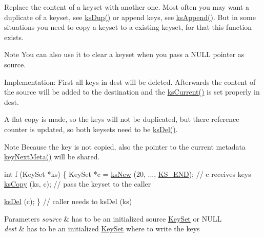 Replace the content of a keyset with another one. Most often you may want a duplicate of a keyset, see \hyperlink{group__keyset_gac59e4b328245463f1451f68d5106151c}{ks\+Dup()} or append keys, see \hyperlink{group__keyset_ga21eb9c3a14a604ee3a8bdc779232e7b7}{ks\+Append()}. But in some situations you need to copy a keyset to a existing keyset, for that this function exists.

\begin{DoxyNote}{Note}
You can also use it to clear a keyset when you pass a N\+U\+LL pointer as {\ttfamily source}.
\end{DoxyNote}
\begin{DoxyParagraph}{Implementation\+:}
First all keys in {\ttfamily dest} will be deleted. Afterwards the content of the source will be added to the destination and the \hyperlink{group__keyset_ga4287b9416912c5f2ab9c195cb74fb094}{ks\+Current()} is set properly in {\ttfamily dest}.
\end{DoxyParagraph}
A flat copy is made, so the keys will not be duplicated, but there reference counter is updated, so both keysets need to be \hyperlink{group__keyset_ga27e5c16473b02a422238c8d970db7ac8}{ks\+Del()}.

\begin{DoxyNote}{Note}
Because the key is not copied, also the pointer to the current metadata \hyperlink{group__keymeta_ga4c88342f580a4291455a801af71ce048}{key\+Next\+Meta()} will be shared.
\end{DoxyNote}

\begin{DoxyCode}
\textcolor{keywordtype}{int} f (KeySet *ks)
\{
        KeySet *c = \hyperlink{group__keyset_ga671e1aaee3ae9dc13b4834a4ddbd2c3c}{ksNew} (20, ..., \hyperlink{kdbenum_8c_a7a28fce3773b2c873c94ac80b8b4cd54}{KS\_END});
        \textcolor{comment}{// c receives keys}
        \hyperlink{group__keyset_gaba1f1dbea191f4d7e7eb3e4296ae7d5e}{ksCopy} (ks, c); \textcolor{comment}{// pass the keyset to the caller}

        \hyperlink{group__keyset_ga27e5c16473b02a422238c8d970db7ac8}{ksDel} (c);
\}       \textcolor{comment}{// caller needs to ksDel (ks)}
\end{DoxyCode}



\begin{DoxyParams}{Parameters}
{\em source} & has to be an initialized source \hyperlink{classkdb_1_1KeySet}{Key\+Set} or N\+U\+LL \\
\hline
{\em dest} & has to be an initialized \hyperlink{classkdb_1_1KeySet}{Key\+Set} where to write the keys \\
\hline
\end{DoxyParams}


